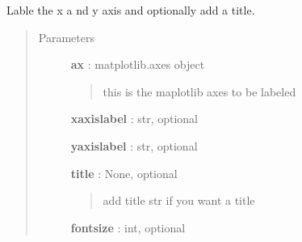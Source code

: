 \documentclass[letterpaper,10pt,english]{sphinxmanual}
\begin{document}

\begin{fulllineitems}
\label{pubplots:pubplots.plot.axis_labels}
Lable the x a nd y axis and optionally add a title.
\begin{quote}\begin{description}
\item[{Parameters}] \leavevmode
\textbf{ax} : matplotlib.axes object
\begin{quote}

this is the maplotlib axes to be labeled
\end{quote}

\textbf{xaxislabel} : str, optional

\textbf{yaxislabel} : str, optional

\textbf{title} : None, optional
\begin{quote}

add title str if you want a title
\end{quote}

\textbf{fontsize} : int, optional

\end{description}\end{quote}

\end{fulllineitems}

\end{document}
